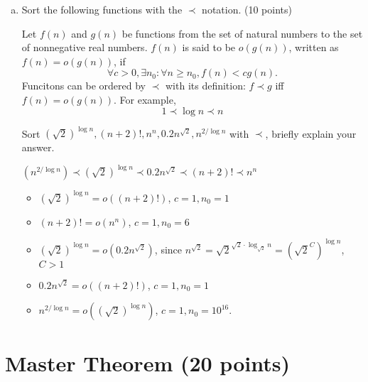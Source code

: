 \documentclass[11pt]{exam}
\begin{document}
\begin{enumerate}[(a)]
\item Sort the following functions with the $\prec$ notation. (10 points)
\begin{definition}
Let $f(n)$ and $g(n)$ be functions from the set of natural numbers to the set of nonnegative real numbers.
$f(n)$ is said to be $o(g(n))$, written as $f(n)=o(g(n))$, if
$$\forall c>0,\exists n_{0}:\forall n\ge n_{0},f(n)<c g(n).$$
Funcitons can be ordered by $\prec$ with its definition: $f\prec g$ iff $f(n)=o(g(n))$. For example,
$$1 \prec \log n \prec n$$
\end{definition}
Sort $(\sqrt{2})^{\log n}, (n+2)!, n^n, 0.2n^{\sqrt{2}},  n^{2/\log n}$ with $\prec$, briefly explain your answer.
\begin{solution}
    $(n^{2/\log n})\prec (\sqrt{2})^{\log n} \prec 0.2 n^{\sqrt{2}} \prec (n+2)! \prec n^n$
    \begin{itemize}
        \item $(\sqrt{2})^{\log n} = o\left((n+2)!\right)$, $c = 1, n_0 = 1$
        \item $(n+2)! = o (n^n)$, $c = 1, n_0 =6$
        \item $(\sqrt{2})^{\log n} = o(0.2n^{\sqrt{2}})$, since $n^{\sqrt{2}} = \sqrt{2} ^ {\sqrt{2} \cdot \log_{\sqrt{2}} n} = (\sqrt{2} ^C) ^{ \log n}$, $C>1$
        \item $0.2 n ^{\sqrt{2}} = o\left((n+2)!\right)$, $c = 1, n_0 = 1$
        \item $n^{2/\log n} = o((\sqrt{2})^{\log n})$, $c=1, n_0 = 10^{16}$.
    \end{itemize}
\end{solution}
\end{enumerate}

\section{Master Theorem (20 points)}
\end{document}
